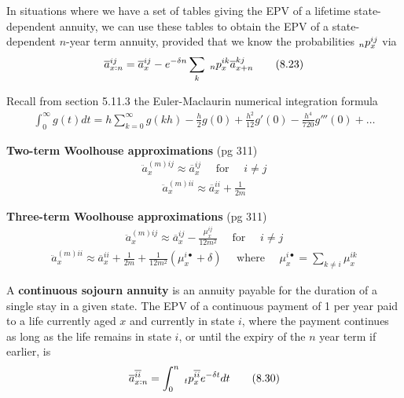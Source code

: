 \documentclass[hidelinks, 12pt]{article}
\theoremstyle{mydefstyle}
\theoremstyle{mythmstyle}
\begin{document}
In situations where we have a set of tables giving the EPV of a lifetime state-dependent annuity, we can use these tables to obtain the EPV of a state-dependent $n$-year term annuity, provided that we know the probabilities $\hspace{0mm}_np_x^{ij}$ via
\begin{gather*}
\overline{a}_{x:n}^{ij} = \overline{a}_x^{ij} - e^{-\delta n} \sum_{k} \hspace{1mm}_np_x^{ik} \overline{a}_{x+n}^{kj} \tag{8.23}
\end{gather*}

Recall from section 5.11.3 the Euler-Maclaurin numerical integration formula
\begin{gather*}
\int_0^{\infty} g(t) dt = h \sum_{k = 0}^{\infty} g(kh) - \frac{h}{2} g(0) + \frac{h^2}{12} g'(0) - \frac{h^4}{720} g'''(0) + \dots \tag{8.25}
\end{gather*}

\textbf{Two-term Woolhouse approximations} (pg 311)
\begin{gather*}
\ddot{a}_x^{(m)ij} \approx \overline{a}_x^{ij} \quad\mbox{ for }\quad i \ne j \tag{8.26}
\end{gather*}
\begin{gather*}
\ddot{a}_x^{(m)ii} \approx \overline{a}_x^{ii} + \frac{1}{2m} \tag{8.27}
\end{gather*}

\textbf{Three-term Woolhouse approximations} (pg 311)
\begin{gather*}
\ddot{a}_x^{(m)ij} \approx \overline{a}_x^{ij} - \frac{\mu_x^{ij}}{12m^2} \quad\mbox{ for }\quad i \ne j \tag{8.28}
\end{gather*}
\begin{gather*}
\ddot{a}_x^{(m)ii} \approx \overline{a}_x^{ii} + \frac{1}{2m} + \frac{1}{12m^2} \left( \mu_x^{i \bullet} + \delta \right)
\quad\mbox{ where }\quad \mu_x^{i \bullet} = \sum_{k \ne i} \mu_x^{ik} \tag{8.29}
\end{gather*}

A \textbf{continuous sojourn annuity} is an annuity payable for the duration of a single stay in a given state. The EPV of a continuous payment of 1 per year paid to a life currently aged $x$ and currently in state $i$, where the payment continues as long as the life remains in state $i$, or until the expiry of the $n$ year term if earlier, is
\begin{gather*}
\overline{a}_{x:n}^{\overline{ii}} = \int_0^n \hspace{1mm}_tp_x^{\overline{ii}} e^{-\delta t} dt \tag{8.30}
\end{gather*}
\end{document}
